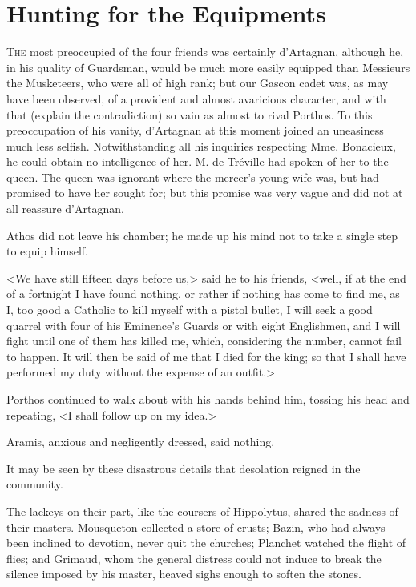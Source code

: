 
\chapter{Hunting for the Equipments}

\lettrine[]{T}{he} most preoccupied of the four friends was certainly d'Artagnan, although he, in his quality of Guardsman, would be much more easily equipped than Messieurs the Musketeers, who were all of high rank; but our Gascon cadet was, as may have been observed, of a provident and almost avaricious character, and with that (explain the contradiction) so vain as almost to rival Porthos. To this preoccupation of his vanity, d'Artagnan at this moment joined an uneasiness much less selfish. Notwithstanding all his inquiries respecting Mme. Bonacieux, he could obtain no intelligence of her. M. de Tréville had spoken of her to the queen. The queen was ignorant where the mercer's young wife was, but had promised to have her sought for; but this promise was very vague and did not at all reassure d'Artagnan. 

Athos did not leave his chamber; he made up his mind not to take a single step to equip himself. 

<We have still fifteen days before us,> said he to his friends, <well, if at the end of a fortnight I have found nothing, or rather if nothing has come to find me, as I, too good a Catholic to kill myself with a pistol bullet, I will seek a good quarrel with four of his Eminence's Guards or with eight Englishmen, and I will fight until one of them has killed me, which, considering the number, cannot fail to happen. It will then be said of me that I died for the king; so that I shall have performed my duty without the expense of an outfit.> 

Porthos continued to walk about with his hands behind him, tossing his head and repeating, <I shall follow up on my idea.> 

Aramis, anxious and negligently dressed, said nothing. 

It may be seen by these disastrous details that desolation reigned in the community. 

The lackeys on their part, like the coursers of Hippolytus, shared the sadness of their masters. Mousqueton collected a store of crusts; Bazin, who had always been inclined to devotion, never quit the churches; Planchet watched the flight of flies; and Grimaud, whom the general distress could not induce to break the silence imposed by his master, heaved sighs enough to soften the stones. 

